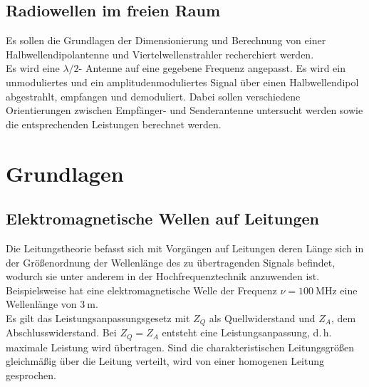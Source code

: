 \documentclass[a4paper,twoside,final]{article}
\begin{document}
\subsection{Radiowellen im freien Raum}
Es sollen die Grundlagen der Dimensionierung und Berechnung von einer Halbwellendipolantenne und Viertelwellenstrahler recherchiert werden.\\
Es wird eine $\lambda / 2$- Antenne auf eine gegebene Frequenz angepasst. Es wird ein unmoduliertes und ein amplitudenmoduliertes Signal über einen Halbwellendipol abgestrahlt, empfangen und demoduliert. Dabei sollen verschiedene Orientierungen zwischen Empfänger- und Senderantenne untersucht werden sowie die entsprechenden Leistungen berechnet werden.
\newpage
\section{Grundlagen} \label{sec:Grundlagen}

\subsection{Elektromagnetische Wellen auf Leitungen}
Die Leitungstheorie befasst sich mit Vorgängen auf Leitungen deren Länge sich in der Größenordnung der Wellenlänge
des zu übertragenden Signals befindet, wodurch sie unter anderem in der Hochfrequenztechnik anzuwenden ist. Beispielsweise hat eine elektromagnetische Welle der Frequenz $\nu = \SI{100}{\mega\hertz}$ eine Wellenlänge von $\SI{3}{\metre}$. \\
Es gilt das Leistungsanpassungsgesetz mit $Z_Q$ als Quellwiderstand und $Z_A$, dem Abschlusswiderstand. Bei $Z_Q = Z_A$ entsteht eine Leistungsanpassung, d.\,h. maximale Leistung wird übertragen. Sind die charakteristischen Leitungsgrößen gleichmäßig über die Leitung verteilt, wird von einer homogenen Leitung gesprochen.
\end{document}
